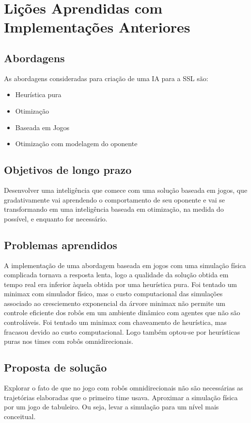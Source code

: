 \chapter{Lições Aprendidas com Implementações Anteriores}

\section{Abordagens}

As abordagens consideradas para criação de uma IA para a SSL são:
\begin{itemize}
 \item Heurística pura
 \item Otimização
 \item Baseada em Jogos
 \item Otimização com modelagem do oponente
\end{itemize}

\section{Objetivos de longo prazo}
Desenvolver uma inteligência que comece com uma solução baseada em jogos, que
gradativamente vai aprendendo o comportamento de seu oponente e vai se
transformando em uma inteligência baseada em otimização, na medida do possível, e
enquanto for necessário.

\section{Problemas aprendidos}
A implementação de uma abordagem baseada em jogos com uma simulação física complicada
tornava a resposta lenta, logo a qualidade da solução obtida em tempo real era inferior
àquela obtida por uma heurística pura.
Foi tentado um minimax com simulador físico, mas o custo computacional das simulações
associado ao cresciemento exponencial da árvore minimax não permite um controle eficiente
dos robôs em um ambiente dinâmico com agentes que não são controláveis.
Foi tentado um minimax com chaveamento de heurística, mas fracasou devido ao
custo computacional. Logo também optou-se por heurísticas puras nos
times com robôs omnidirecionais.

\section{Proposta de solução}
Explorar o fato de que no jogo com robôs omnidirecionais não são necessárias as
trajetórias elaboradas que o primeiro time usava.
Aproximar a simulação física por um jogo de tabuleiro. Ou seja, levar a simulação para um
nível mais conceitual.

